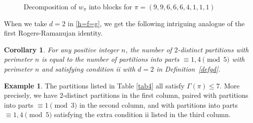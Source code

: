 \documentclass[12pt]{amsart}
\numberwithin{equation}{section}
\theoremstyle{plain}
\newtheorem{corollary}[theorem]{Corollary}
\theoremstyle{definition}
\newtheorem{example}[theorem]{Example}
\begin{document}
\begin{figure}
\caption{Decomposition of $w_{\pi}$ into blocks for $\pi=(9,9,6,6,6,4,1,1,1)$}
\label{block}
\end{figure}
When we take $d=2$ in \eqref{h=f=g}, we get the following intriguing analogue of the first Rogers-Ramanujan identity.
\begin{corollary}
For any positive integer $n$, the number of $2$-distinct partitions with perimeter $n$ is equal to the number of partitions into parts $\equiv 1,4 \pmod 5$ with perimeter $n$ and satisfying condition ii with $d=2$ in Definition~\ref{defgd}.
\end{corollary}
\begin{example}
The partitions listed in Table \ref{tab4} all satisfy $\Gamma(\pi)\leq 7$. More precisely, we have $2$-distinct partitions in the first column, paired with partitions into parts $\equiv 1\pmod{3}$ in the second column, and with partitions into parts $\equiv 1,4 \pmod{5}$ satisfying the extra condition ii listed in the third column.
\end{example}
\end{document}
